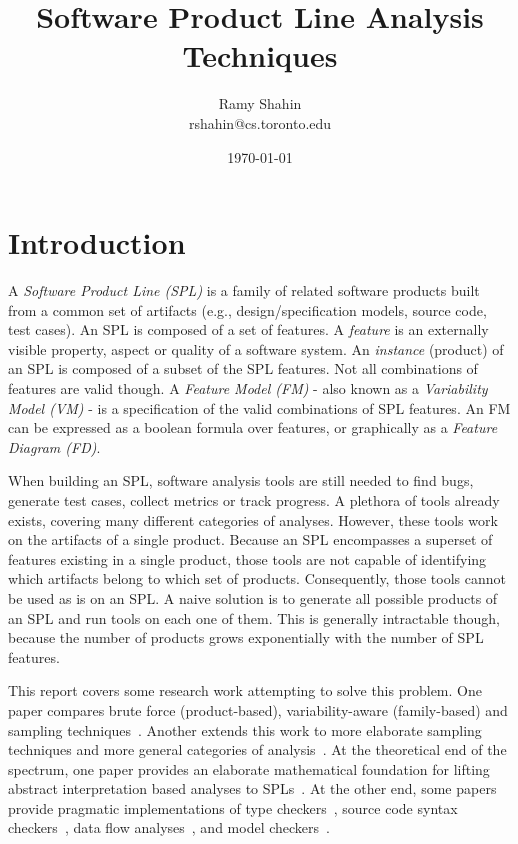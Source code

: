 \documentclass[11pt]{article}
\title{Software Product Line Analysis Techniques}
\author{Ramy Shahin \\ rshahin@cs.toronto.edu}
\date{\today}                                           %
\newcommand{\term}[1] {\emph{#1}}
\begin{document}
\maketitle


\section{Introduction}
A \term{Software Product Line (SPL)} is a family of related software products built from a common set of artifacts (e.g., design/specification models, source code, test cases). An SPL is composed of a set of features. A \term{feature} is an externally visible property, aspect or quality of a software system. An \term{instance} (product) of an SPL is composed of a subset of the SPL features. Not all combinations of features are valid though. A \term{Feature Model (FM)} - also known as a \term{Variability Model (VM)} - is a specification of the valid combinations of SPL features. An FM can be expressed as a boolean formula over features, or graphically as a \term{Feature Diagram (FD)}.

When building an SPL, software analysis tools are still needed to find bugs, generate test cases, collect metrics or track progress. A plethora of tools already exists, covering many different categories of analyses. However, these tools work on the artifacts of a single product. Because an SPL encompasses a superset of features existing in a single product, those tools are not capable of identifying which artifacts belong to which set of products. Consequently, those tools cannot be used as is on an SPL. A naive solution is to generate all possible products of an SPL and run tools on each one of them. This is generally intractable though, because the number of products grows exponentially with the number of SPL features.

This report covers some research work attempting to solve this problem. One paper compares brute force (product-based), variability-aware (family-based) and sampling techniques~\cite{Apel:2013}. Another extends this work to more elaborate sampling techniques and more general categories of analysis~\cite{Liebig:2013}. At the theoretical end of the spectrum, one paper provides an elaborate mathematical foundation for lifting abstract interpretation based analyses to SPLs~\cite{Midtgaard:2015}. At the other end, some papers provide pragmatic implementations of type checkers~\cite{Kastner:2012}, source code syntax checkers~\cite{Gazzillo:2012}, data flow analyses~\cite{Bodden:2013}, and model checkers~\cite{Classen:2013}.
\end{document}
